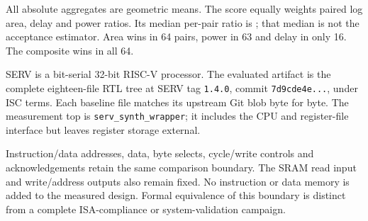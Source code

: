 All absolute aggregates are geometric means. The score equally weights paired log area, delay and power ratios. Its median per-pair ratio is \CompositeMedian; that median is not the acceptance estimator. Area wins in 64 pairs, power in 63 and delay in only 16. The composite wins in all 64.

SERV is a bit-serial 32-bit RISC-V processor. The evaluated artifact is the complete eighteen-file RTL tree at SERV tag \texttt{1.4.0}, commit \texttt{7d9cde4e...}, under ISC terms. Each baseline file matches its upstream Git blob byte for byte. The measurement top is \texttt{serv\_synth\_wrapper}; it includes the CPU and register-file interface but leaves register storage external.

\begin{center}\end{center}

Instruction/data addresses, data, byte selects, cycle/write controls and acknowledgements retain the same comparison boundary. The SRAM read input and write/address outputs also remain fixed. No instruction or data memory is added to the measured design. Formal equivalence of this boundary is distinct from a complete ISA-compliance or system-validation campaign.

